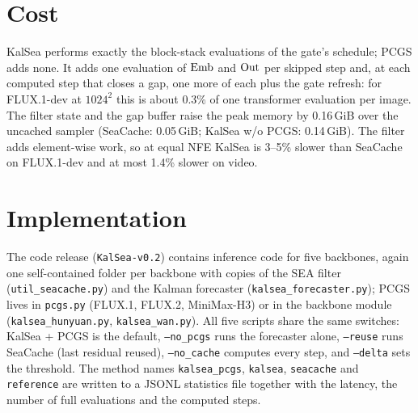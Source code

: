 \section{Cost}\label{sec:kalsea-cost}

KalSea performs exactly the block-stack evaluations of the gate's schedule; PCGS adds none. It adds one evaluation of $\mathrm{Emb}$ and $\mathrm{Out}$ per skipped step and, at each computed step that closes a gap, one more of each plus the gate refresh: for FLUX.1-dev at $1024^2$ this is about 0.3\% of one transformer evaluation per image. The filter state and the gap buffer raise the peak memory by 0.16\,GiB over the uncached sampler (SeaCache: 0.05\,GiB; KalSea w/o PCGS: 0.14\,GiB). The filter adds element-wise work, so at equal NFE KalSea is 3--5\% slower than SeaCache on FLUX.1-dev and at most 1.4\% slower on video.

\section{Implementation}\label{sec:kalsea-impl}

The code release (\texttt{KalSea-v0.2}) contains inference code for five backbones, again one self-contained folder per backbone with copies of the SEA filter (\texttt{util\_seacache.py}) and the Kalman forecaster (\texttt{kalsea\_forecaster.py}); PCGS lives in \texttt{pcgs.py} (FLUX.1, FLUX.2, MiniMax-H3) or in the backbone module (\texttt{kalsea\_hunyuan.py}, \texttt{kalsea\_wan.py}). All five scripts share the same switches: KalSea + PCGS is the default, \texttt{--no\_pcgs} runs the forecaster alone, \texttt{--reuse} runs SeaCache (last residual reused), \texttt{--no\_cache} computes every step, and \texttt{--delta} sets the threshold. The method names \texttt{kalsea\_pcgs}, \texttt{kalsea}, \texttt{seacache} and \texttt{reference} are written to a JSONL statistics file together with the latency, the number of full evaluations and the computed steps.

